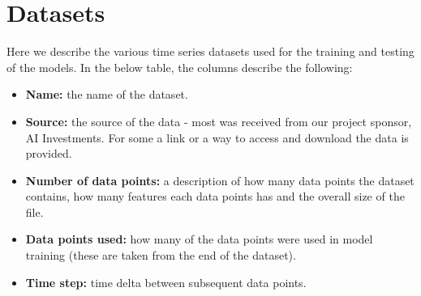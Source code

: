 \section{Datasets}
Here we describe the various time series datasets used for the training and testing of the models. In the below table, the columns describe the following:
\begin{itemize}
	\item \textbf{Name:} the name of the dataset.
	\item \textbf{Source:} the source of the data - most was received from our project sponsor, AI Investments. For some a link or a way to access and download the data is provided.
	\item \textbf{Number of data points:} a description of how many data points the dataset contains, how many features each data points has and the overall size of the file.
	\item \textbf{Data points used:} how many of the data points were used in model training (these are taken from the end of the dataset).
	\item \textbf{Time step:} time delta between subsequent data points.
\end{itemize}



